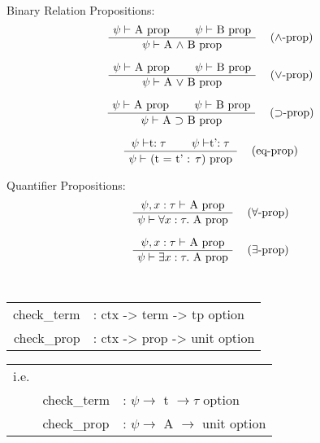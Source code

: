 \documentclass[twoside,a4paper]{article}
\begin{document}
Binary Relation Propositions:
\[
\AxiomC{$\psi \vdash$ A prop}
\AxiomC{$\psi \vdash$ B prop}
\RightLabel{\quad ($\wedge$-prop)}
\BinaryInfC{$\psi \vdash$ A $\wedge$ B prop}
\DisplayProof
\]

\[
\AxiomC{$\psi \vdash$ A prop}
\AxiomC{$\psi \vdash$ B prop}
\RightLabel{\quad ($\vee$-prop)}
\BinaryInfC{$\psi \vdash$ A $\vee$ B prop}
\DisplayProof
\]

\[
\AxiomC{$\psi \vdash$ A prop}
\AxiomC{$\psi \vdash$ B prop}
\RightLabel{\quad ($\supset$-prop)}
\BinaryInfC{$\psi \vdash$ A $\supset$ B prop}
\DisplayProof
\]

\[
\AxiomC{$\psi \vdash $t$ : \tau$}
\AxiomC{$\psi \vdash $t'$ : \tau$}
\RightLabel{\quad (eq-prop)}
\BinaryInfC{$\psi \vdash$ (t = t' : $\tau$) prop}
\DisplayProof
\]

Quantifier Propositions:
\[
\AxiomC{$\psi , x : \tau \vdash$ A prop}
\RightLabel{\quad ($\forall$-prop)}
\UnaryInfC{$\psi \vdash \forall x : \tau .$ A prop}
\DisplayProof
\]

\[
\AxiomC{$\psi , x : \tau \vdash$ A prop}
\RightLabel{\quad ($\exists$-prop)}
\UnaryInfC{$\psi \vdash \exists x : \tau .$ A prop}
\DisplayProof
\]

\begin{center}
\tt
\begin{tabular} {rl}
check_term &: ctx -> term -> tp option
\\
check_prop &: ctx -> prop -> unit option
\end{tabular}

\begin{tabular} {rll}

i.e.& \\
& check_term &: $\psi \rightarrow$ t $\rightarrow \tau$ option
\\
& check_prop &: $\psi \rightarrow$ A $\rightarrow$ unit option
\end{tabular}
\end{center}
\end{document}
